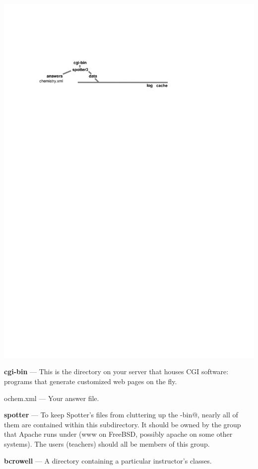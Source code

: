 \documentclass{doc}
\begin{document}
\noindent\includegraphics{doc_figs/file-tree}\label{interfacing}

\newcommand{\dir}[1]{\noindent\textbf{#1} --- }
\newcommand{\file}[1]{\noindent{}#1 --- }

\dir{cgi-bin} This is the directory on your server that houses CGI software:
programs that generate customized web pages on the fly.

\file{ochem.xml} Your answer file.

\dir{spotter} To keep Spotter's files from cluttering up the \verb@cgi-bin@,
nearly all of them are contained within this subdirectory. It should be owned
by the group that Apache runs under (www on FreeBSD, possibly apache on some
other systems). The users (teachers) should all be members of this group.

\dir{bcrowell} A directory containing a particular instructor's classes.
\end{document}
